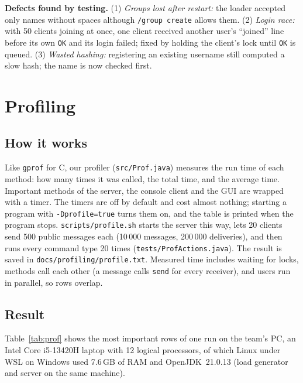 \documentclass[conference]{IEEEtran}
\newcommand{\code}[1]{\texttt{#1}}
\begin{document}
\textbf{Defects found by testing.}
(1) \emph{Groups lost after restart:} the loader accepted only names without spaces although \code{/group create} allows them.
(2) \emph{Login race:} with 50 clients joining at once, one client received another user's ``joined'' line before its own \code{OK} and its login failed;
fixed by holding the client's lock until \code{OK} is queued.
(3) \emph{Wasted hashing:} registering an existing username still computed a slow hash; the name is now checked first.

\section{Profiling}\label{sec:prof}

\subsection{How it works}
Like \code{gprof} for C, our profiler (\code{src/Prof.java}) measures the run time of each method: how many times it was called, the total time, and the average time.
Important methods of the server, the console client and the GUI are wrapped with a timer. The timers are off by default and cost almost nothing;
starting a program with \code{-Dprofile=true} turns them on, and the table is printed when the program stops.
\code{scripts/profile.sh} starts the server this way, lets 20 clients send 500 public messages each (10\,000 messages, 200\,000 deliveries),
and then runs every command type 20 times (\code{tests/ProfActions.java}). The result is saved in \code{docs/profiling/profile.txt}.
Measured time includes waiting for locks, methods call each other (a message calls \code{send} for every receiver), and users run in parallel, so rows overlap.

\subsection{Result}
Table~\ref{tab:prof} shows the most important rows of one run on the team's PC, an Intel Core i5-13420H laptop with 12 logical processors, of which Linux under WSL on Windows used 7.6\,GB of RAM and OpenJDK~21.0.13 (load generator and server on the same machine).
\end{document}
